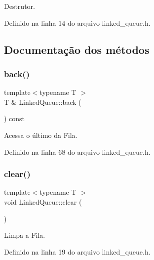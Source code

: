 Destrutor. 



Definido na linha 14 do arquivo linked\+\_\+queue.\+h.



\subsection{Documentação dos métodos}
\mbox{\label{classstructures_1_1_linked_queue_a194d5842787ddffafecfb44bd14e8d9d}} 
\subsubsection{\texorpdfstring{back()}{back()}}
{\footnotesize\ttfamily template$<$typename T $>$ \\
T \& Linked\+Queue\+::back (\begin{DoxyParamCaption}{ }\end{DoxyParamCaption}) const}



Acessa o último da Fila. 



Definido na linha 68 do arquivo linked\+\_\+queue.\+h.

\mbox{\label{classstructures_1_1_linked_queue_a7fd13289965085b6224d3c87e9555a1a}} 
\subsubsection{\texorpdfstring{clear()}{clear()}}
{\footnotesize\ttfamily template$<$typename T $>$ \\
void Linked\+Queue\+::clear (\begin{DoxyParamCaption}{ }\end{DoxyParamCaption})}



Limpa a Fila. 



Definido na linha 19 do arquivo linked\+\_\+queue.\+h.

